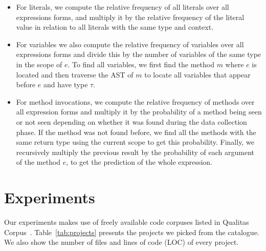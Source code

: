 \documentclass{article} %
\begin{document}
\begin{itemize}
   \item For literals, we compute the relative frequency of all literals over all expressions forms, and multiply it by the relative frequency of the literal value in relation to all literals with the same type and context.
   \item For variables we also compute the relative frequency of variables over all expressions forms and divide this by the number of variables of the same type in the scope of $e$. To find all variables, we first find the method $m$ where $e$ is located and then traverse the AST of $m$ to locate all variables that appear before $e$ and have type $\tau$.
   \item For method invocations, we compute the relative frequency of methods over all expression forms and multiply it by the probability of a method being seen or not seen depending  on whether it was found during the data collection phase. If the method was not found before, we find all the methods with the same return type using the current scope to get this probability. Finally, we recursively multiply the previous result by the probability of each argument of the method $e$, to get the prediction of the whole expression.
\end{itemize}

\section*{Experiments}


Our experiments makes use of freely available code corpuses listed in Qualitas Corpus~\cite{QualitasCorpus:APSEC:2010}.
Table~\ref{tab:projects} presents the projects we picked from the catalogue. We also show the number of files and
lines of code (LOC) of every project.
\end{document}

